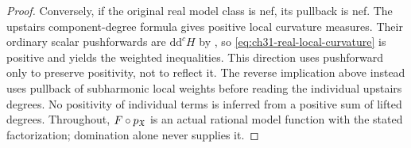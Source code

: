 \begin{proof}
Conversely, if the original real model class is nef, its pullback
is nef.  The upstairs component-degree formula gives positive
local curvature measures.  Their ordinary scalar pushforwards
are \(\mathrm d\mathrm d^cH\) by
\cite[Theorem~3.2.10(i)]{Thu05}, so
\eqref{eq:ch31-real-local-curvature} is positive and yields the
weighted inequalities.  This direction uses pushforward only to
preserve positivity, not to reflect it.
The reverse implication above instead uses pullback of
subharmonic local weights before reading the individual upstairs
degrees.  No positivity of individual terms is inferred from a
positive sum of lifted degrees.
Throughout, \(F\circ p_{\mathfrak X}\) is an actual rational model function
with the stated factorization; domination alone never supplies it.
\end{proof}

